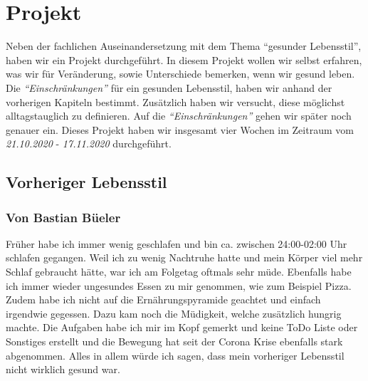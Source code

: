 \chapter{Projekt}
\authortoc{\dario}{\chapterident}
Neben der fachlichen Auseinandersetzung mit dem Thema “gesunder Lebensstil”, haben wir ein Projekt durchgeführt.
\newline
In diesem Projekt wollen wir selbst erfahren, was wir für Veränderung, sowie Unterschiede bemerken, wenn wir gesund leben.
\newline
Die \textit{“Einschränkungen”} für ein gesunden Lebensstil, haben wir anhand der vorherigen Kapiteln bestimmt. Zusätzlich haben wir versucht, diese möglichst alltagstauglich zu definieren. Auf die \textit{“Einschränkungen”} gehen wir später noch genauer ein.
\newline
Dieses Projekt haben wir insgesamt vier Wochen im Zeitraum vom \textit{21.10.2020} - \textit{17.11.2020} durchgeführt.
\section{Vorheriger Lebensstil}
\subsection{Von Bastian Büeler}
\authortoc{\bastian}{\subsectionident}
Früher habe ich immer wenig geschlafen und bin ca. zwischen 24:00-02:00 Uhr schlafen gegangen. Weil ich zu wenig Nachtruhe hatte und mein Körper viel mehr Schlaf gebraucht hätte, war ich am Folgetag oftmals sehr müde. Ebenfalls habe ich immer wieder ungesundes Essen zu mir genommen, wie zum Beispiel Pizza. Zudem habe ich nicht auf die Ernährungspyramide geachtet und einfach irgendwie gegessen. Dazu kam noch die Müdigkeit, welche zusätzlich hungrig machte. Die Aufgaben habe ich mir im Kopf gemerkt und keine ToDo Liste oder Sonstiges erstellt und die Bewegung hat seit der Corona Krise ebenfalls stark abgenommen. Alles in allem würde ich sagen, dass mein vorheriger Lebensstil nicht wirklich gesund war.
